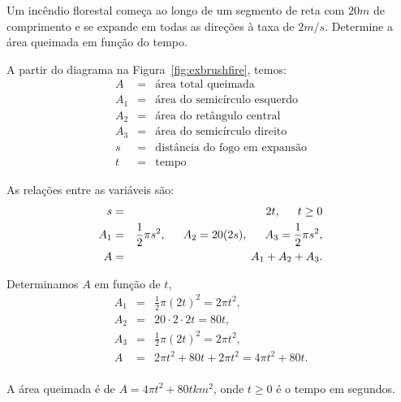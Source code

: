 \begin{example}
  Um incêndio florestal começa ao longo de um segmento de reta com
  $20\si{m}$ de comprimento e se expande em todas as direções à taxa
  de $2\si{m/s}$. Determine a área queimada em função do tempo.
  \begin{stepanalysis}
  \item A partir do diagrama na Figura~\ref{fig:exbrushfire}, temos:
        \begin{eqnarray*}
          A & = & \text{área total queimada} \\
          A_1 & = & \text{área do semicírculo esquerdo} \\
          A_2 & = & \text{área do retângulo central} \\
          A_3 & = & \text{área do semicírculo direito} \\
          s & = & \text{distância do fogo em expansão} \\
          t & = & \text{tempo}
        \end{eqnarray*}
  \item As relações entre as variáveis são:
        \begin{eqnarray*}
          s & = & 2t, \hspace{1.5em} t \ge 0 \\
          A_1 & = & \frac{1}{2}\pi s^2, \hspace{1.5em} A_2 = 20(2s),
            \hspace{1.5em} A_3 = \frac{1}{2} \pi s^2, \\
          A & = & A_1 + A_2 + A_3.
        \end{eqnarray*}
  \item Determinamos $A$ em função de $t$,
        \begin{eqnarray*}
          A_1 & = & \frac{1}{2}\pi(2t)^2 = 2 \pi t^2,\\
          A_2 & = & 20 \cdot 2 \cdot 2t = 80t, \\
          A_3 & = & \frac{1}{2}\pi(2t)^2 = 2\pi t^2, \\
          A & = & 2\pi t^2 + 80t + 2\pi t^2 = 4\pi t^2 + 80t. \\
        \end{eqnarray*}
  \end{stepanalysis}
  \begin{interpretsolution}
    A área queimada é de $A = 4\pi t^2 + 80t \si{km^2}$, onde $t \ge 0$
    é o tempo em segundos.
  \end{interpretsolution}
\end{example}

